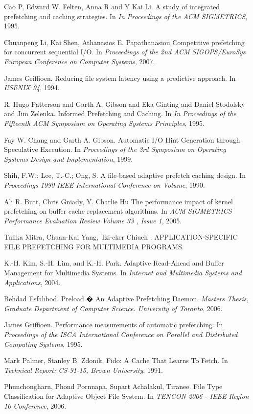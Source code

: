 \documentclass[twocolumn,10pt]{article}
\begin{document}
\begin{thebibliography}{99}

 Cao P, Edward W. Felten, Anna R and Y Kai Li.
	A study of integrated prefetching and caching strategies.
	In {\em In Proceedings of the ACM SIGMETRICS}, 1995.
	
 Chuanpeng Li, Kai Shen, Athanasios E. Papathanasiou
	Competitive prefetching for concurrent sequential I/O.
	In {\em Proceedings of the 2nd ACM SIGOPS/EuroSys European Conference on Computer Systems}, 2007.

 James Griffioen.
	Reducing file system latency using a predictive approach.
	In {\em USENIX 94}, 1994.

 R. Hugo Patterson and Garth A. Gibson and Eka Ginting and Daniel Stodolsky and Jim Zelenka.
	Informed Prefetching and Caching.
	In {\em In Proceedings of the Fifteenth ACM Symposium on Operating Systems Principles}, 1995.
	
 Fay W. Chang and Garth A. Gibson.
	Automatic I/O Hint Generation through Speculative Execution.
	In {\em Proceedings of the 3rd Symposium on Operating Systems Design and Implementation}, 1999.

 Shih, F.W.; Lee, T.-C.; Ong, S.
	A file-based adaptive prefetch caching design.
	In {\em Proceedings 1990 IEEE International Conference on Volume}, 1990.

 Ali R. Butt, Chris Gniady, Y. Charlie Hu
	The performance impact of kernel prefetching on buffer cache replacement algorithms.
	In {\em ACM SIGMETRICS Performance Evaluation Review Volume 33 , Issue 1}, 2005.

 Tulika Mitra, Chuan-Kai Yang, Tzi-cker Chiueh	.
	APPLICATION-SPECIFIC FILE PREFETCHING FOR MULTIMEDIA PROGRAMS.


 K.-H. Kim, S.-H. Lim, and K.-H. Park.
	Adaptive Read-Ahead and Buffer Management for Multimedia Systems.
	In {\em Internet and Multimedia Systems and Applications}, 2004.
	
 Behdad Esfahbod.
	Preload � An Adaptive Prefetching Daemon.
	{\em Masters Thesis, Graduate Department of Computer Science. University of Toronto}, 2006.

 James Griffioen.
	Performance measurements of automatic prefetching.
	In {\em Proceedings of the ISCA International Conference on Parallel and Distributed Computing Systems}, 1995.

 Mark Palmer, Stanley B. Zdonik.
	Fido: A Cache That Learns To Fetch.
	In {\em Technical Report: CS-91-15, Brown University}, 1991.
	
Phunchongharn, Phond Pornnapa, Supart Achalakul, Tiranee.
	File Type Classification for Adaptive Object File System.
	In {\em TENCON 2006 - IEEE Region 10 Conference}, 2006.
\end{thebibliography}
\end{document}

